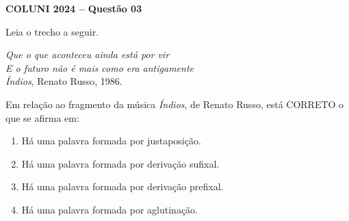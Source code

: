 \textbf{COLUNI 2024 -- Questão 03}\par\medskip Leia o trecho a seguir.

\begin{center}
\textit{Que o que aconteceu ainda está por vir}\\
\textit{E o futuro não é mais como era antigamente}\\
\textit{Índios}, Renato Russo, 1986.
\end{center}

Em relação ao fragmento da música \textit{Índios}, de Renato Russo, está CORRETO o que se afirma em:
\begin{enumerate}
\item Há uma palavra formada por justaposição.
\item Há uma palavra formada por derivação sufixal.
\item Há uma palavra formada por derivação prefixal.
\item Há uma palavra formada por aglutinação.
\end{enumerate}
